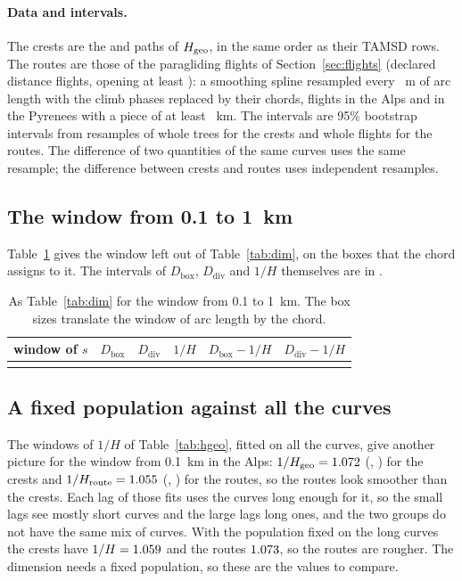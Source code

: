 \paragraph{Data and intervals.} The crests are the \CgAlpsPaths{} and \CgPyrPaths{} paths of $H_{\mathrm{geo}}$, in the same order as their TAMSD rows. The routes are those of the paragliding flights of Section~\ref{sec:flights}
(declared distance flights, opening at least \DmOpening): a smoothing spline resampled every \DmStep~m of arc length with the climb phases replaced by their chords, \DmFlightsAlps{} flights in the Alps and \DmFlightsPyr{} in the Pyrenees
with a piece of at least \DmMinPieceKm~km. The intervals are 95\% bootstrap intervals from \DmBoot{} resamples of whole trees for the crests and whole flights for the routes. The difference of two quantities of the same curves uses the same resample;
the difference between crests and routes uses independent resamples.

\subsection{The window from 0.1 to 1~km}

Table~\ref{tab:dimshort} gives the window left out of Table~\ref{tab:dim}, on the boxes that the chord assigns to it. The intervals of $D_{\mathrm{box}}$, $D_{\mathrm{div}}$ and $1/H$ themselves are in
.

\begin{table}[H]
\centering
\caption{As Table~\ref{tab:dim} for the window from 0.1 to 1~km. The box sizes translate the window of arc length by the chord.}
\label{tab:dimshort}
\small
\setlength{\tabcolsep}{4pt}
\begin{tabular}{lccccc}
\toprule
window of $s$ & $D_{\mathrm{box}}$ & $D_{\mathrm{div}}$ & $1/H$ & $D_{\mathrm{box}}-1/H$ & $D_{\mathrm{div}}-1/H$ \\
\midrule
\\
\bottomrule
\end{tabular}
\end{table}

\subsection{A fixed population against all the curves}

The windows of $1/H$ of Table~\ref{tab:hgeo}, fitted on all the curves, give another picture for the window from 0.1~km in the Alps: $1/H_{\mathrm{geo}}=1.072$ (\DmCrAlpsFromStdInvHLo, \DmCrAlpsFromStdInvHHi) for the crests and
$1/H_{\mathrm{route}}=1.055$ (\DmRtAlpsFromStdInvHLo, \DmRtAlpsFromStdInvHHi) for the routes, so the routes look smoother than the crests. Each lag of those fits uses the curves long enough for it, so the small lags see mostly short curves
and the large lags long ones, and the two groups do not have the same mix of curves. With the population fixed on the long curves the crests have $1/H=1.059$ and the routes $1.073$, so the routes are rougher.
The dimension needs a fixed population, so these are the values to compare.

